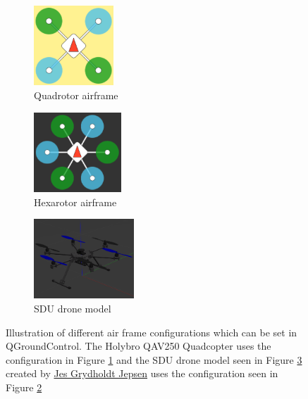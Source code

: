 \documentclass[../Head/report.tex]{subfiles}
\begin{document}
\begin{figure}[H]
    \centering
    \begin{subfigure}[b]{.27\textwidth}
        \centering
        \includegraphics[height=3.0cm]{../Figures/Quadrotor.png}
        \caption{Quadrotor airframe}
        \label{fig:quadrotor}
    \end{subfigure}
    \begin{subfigure}[b]{.27\textwidth}
        \centering
        \includegraphics[height=3.0cm]{../Figures/hexarotor.png}
        \caption{Hexarotor airframe}
        \label{fig:hexarotor}
    \end{subfigure}
    \begin{subfigure}[b]{.34\textwidth}
        \centering
        \includegraphics[height=3.0cm]{../Figures/sdu_drone.png}
        \caption{SDU drone model}
        \label{fig:sdu_drone}
    \end{subfigure}
    \caption{Illustration of different air frame configurations which can be set in QGroundControl. The Holybro QAV250 Quadcopter uses the configuration in Figure \ref{fig:quadrotor} and the SDU drone model seen in Figure \ref{fig:sdu_drone} created by \href{https://portal.findresearcher.sdu.dk/da/persons/jes-grydholdt-jepsen}{Jes Grydholdt Jepsen} uses the configuration seen in Figure \ref{fig:hexarotor}}
    \label{fig:airframes}
\end{figure}
\end{document}
